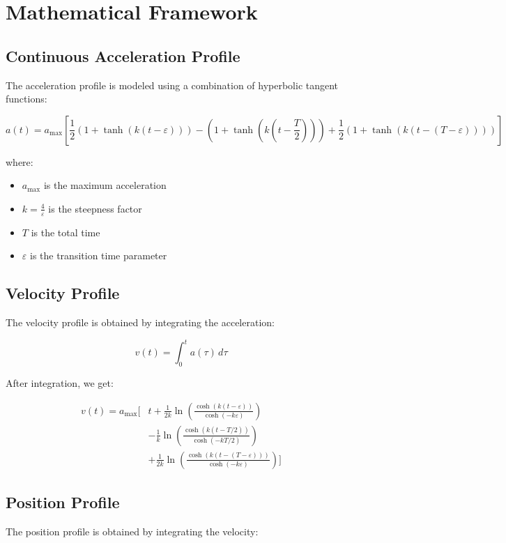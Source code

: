 \documentclass[12pt,a4paper]{article}
\begin{document}
\section{Mathematical Framework}

\subsection{Continuous Acceleration Profile}
The acceleration profile is modeled using a combination of hyperbolic tangent functions:

\begin{equation}
a(t) = a_{\text{max}}\left[\frac{1}{2}(1 + \tanh(k(t-\varepsilon))) - (1 + \tanh(k(t-\frac{T}{2}))) + \frac{1}{2}(1 + \tanh(k(t-(T-\varepsilon))))\right]
\end{equation}

where:
\begin{itemize}
\item $a_{\text{max}}$ is the maximum acceleration
\item $k = \frac{4}{\varepsilon}$ is the steepness factor
\item $T$ is the total time
\item $\varepsilon$ is the transition time parameter
\end{itemize}

\subsection{Velocity Profile}
The velocity profile is obtained by integrating the acceleration:

\begin{equation}
v(t) = \int_0^t a(\tau)\,d\tau
\end{equation}

After integration, we get:

\begin{equation}
\begin{split}
v(t) = a_{\text{max}}\Big[&t + \frac{1}{2k}\ln\left(\frac{\cosh(k(t-\varepsilon))}{\cosh(-k\varepsilon)}\right) \\
&- \frac{1}{k}\ln\left(\frac{\cosh(k(t-T/2))}{\cosh(-kT/2)}\right) \\
&+ \frac{1}{2k}\ln\left(\frac{\cosh(k(t-(T-\varepsilon)))}{\cosh(-k\varepsilon)}\right)\Big]
\end{split}
\end{equation}

\subsection{Position Profile}
The position profile is obtained by integrating the velocity:
\end{document}
